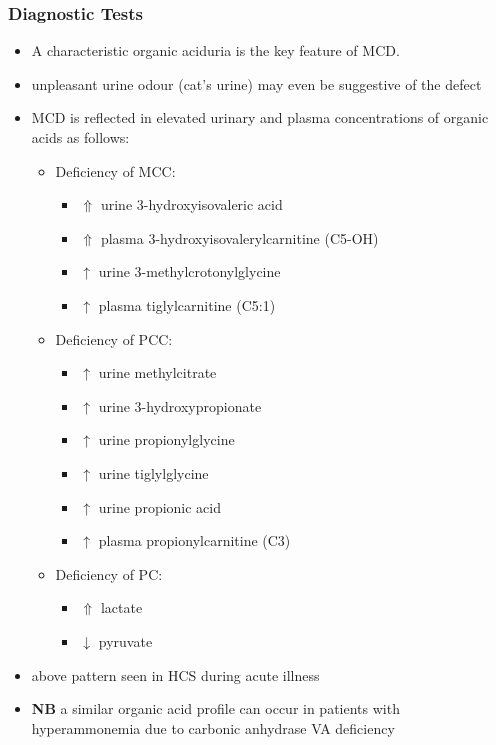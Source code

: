 \documentclass{scrartcl}
\begin{document}
\subsubsection{Diagnostic Tests}
\label{sec:org19cc19b}
\begin{itemize}
\item A characteristic organic aciduria is the key feature of MCD.
\item unpleasant urine odour (cat’s urine) may even be suggestive of the
defect
\item MCD is reflected in elevated urinary and plasma concentrations of
organic acids as follows:
\begin{itemize}
\item Deficiency of MCC:
\begin{itemize}
\item \(\Uparrow\) urine 3-hydroxyisovaleric acid
\item \(\Uparrow\) plasma 3-hydroxyisovalerylcarnitine (C5-OH)
\item \(\uparrow\) urine 3-methylcrotonylglycine
\item \(\uparrow\) plasma tiglylcarnitine (C5:1)
\end{itemize}
\item Deficiency of PCC:
\begin{itemize}
\item \(\uparrow\) urine methylcitrate
\item \(\uparrow\) urine 3-hydroxypropionate
\item \(\uparrow\) urine propionylglycine
\item \(\uparrow\) urine tiglylglycine
\item \(\uparrow\) urine propionic acid
\item \(\uparrow\) plasma propionylcarnitine (C3)
\end{itemize}
\item Deficiency of PC:
\begin{itemize}
\item \(\Uparrow\) lactate
\item \(\downarrow\) pyruvate
\end{itemize}
\end{itemize}
\item above pattern seen in HCS during acute illness
\item \textbf{NB} a similar organic acid profile can occur in patients with
hyperammonemia due to carbonic anhydrase VA deficiency
\end{itemize}
\end{document}
